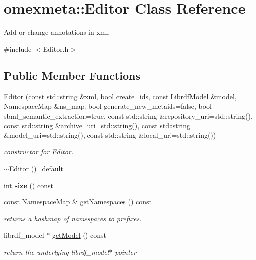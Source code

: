 \hypertarget{classomexmeta_1_1Editor}{}\section{omexmeta\+:\+:Editor Class Reference}
\label{classomexmeta_1_1Editor}


Add or change annotations in xml.  




{\ttfamily \#include $<$Editor.\+h$>$}

\subsection*{Public Member Functions}
\begin{DoxyCompactItemize}
\item 
\hyperlink{classomexmeta_1_1Editor_a6ac976c1a3762f77a577b5735cd509f4}{Editor} (const std\+::string \&xml, bool create\+\_\+ids, const \hyperlink{classredland_1_1LibrdfModel}{Librdf\+Model} \&model, Namespace\+Map \&ns\+\_\+map, bool generate\+\_\+new\+\_\+metaids=false, bool sbml\+\_\+semantic\+\_\+extraction=true, const std\+::string \&repository\+\_\+uri=std\+::string(), const std\+::string \&archive\+\_\+uri=std\+::string(), const std\+::string \&model\+\_\+uri=std\+::string(), const std\+::string \&local\+\_\+uri=std\+::string())
\begin{DoxyCompactList}\small\item\em constructor for \hyperlink{classomexmeta_1_1Editor}{Editor}. \end{DoxyCompactList}\item 
\hyperlink{classomexmeta_1_1Editor_aa11380bb7e2ca7859937c3f5907b6240}{$\sim$\+Editor} ()=default
\item 
\mbox{\label{classomexmeta_1_1Editor_ab5b39f1f137312ce77575e73a86dfb05}} 
int {\bfseries size} () const
\item 
const Namespace\+Map \& \hyperlink{classomexmeta_1_1Editor_a514443fe99a6e52154d1fe4f7ec94618}{get\+Namespaces} () const
\begin{DoxyCompactList}\small\item\em returns a hashmap of namespaces to prefixes. \end{DoxyCompactList}\item 
librdf\+\_\+model $\ast$ \hyperlink{classomexmeta_1_1Editor_a4b2610fb802eb306349d69ae6fde60c0}{get\+Model} () const
\begin{DoxyCompactList}\small\item\em return the underlying librdf\+\_\+model$\ast$ pointer \end{DoxyCompactList}\item 

\end{DoxyCompactItemize}
